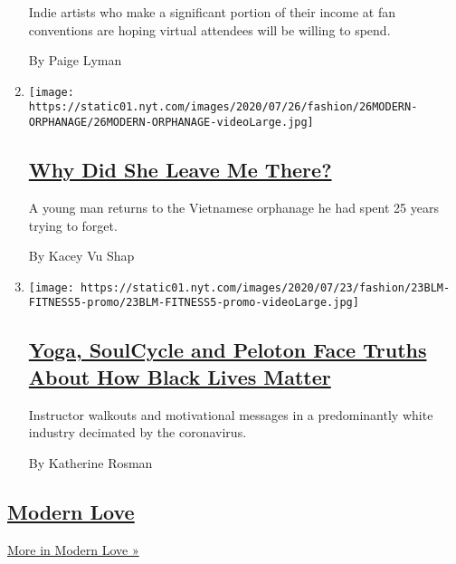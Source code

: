 \begin{enumerate}
  Indie artists who make a significant portion of their income at fan
  conventions are hoping virtual attendees will be willing to spend.

  By Paige Lyman
\item
  \texttt{[image: https://static01.nyt.com/images/2020/07/26/fashion/26MODERN-ORPHANAGE/26MODERN-ORPHANAGE-videoLarge.jpg]}

  \hypertarget{why-did-she-leave-me-there}{%
  \subsection{\texorpdfstring{\href{/2020/07/24/style/modern-love-adoption-vietnam-why-did-she-leave-me-there.html}{Why
  Did She Leave Me
  There?}}{Why Did She Leave Me There?}}\label{why-did-she-leave-me-there}}

  A young man returns to the Vietnamese orphanage he had spent 25 years
  trying to forget.

  By Kacey Vu Shap
\item
  \texttt{[image: https://static01.nyt.com/images/2020/07/23/fashion/23BLM-FITNESS5-promo/23BLM-FITNESS5-promo-videoLarge.jpg]}

  \hypertarget{yoga-soulcycle-and-peloton-face-truths-about-how-black-lives-matter}{%
  \subsection{\texorpdfstring{\href{/2020/07/23/style/peloton-black-lives-matter-ride-soul-cycle-y7.html}{Yoga,
  SoulCycle and Peloton Face Truths About How Black Lives
  Matter}}{Yoga, SoulCycle and Peloton Face Truths About How Black Lives Matter}}\label{yoga-soulcycle-and-peloton-face-truths-about-how-black-lives-matter}}

  Instructor walkouts and motivational messages in a predominantly white
  industry decimated by the coronavirus.

  By Katherine Rosman
\end{enumerate}

\hypertarget{modern-love}{%
\subsection{\texorpdfstring{\href{/column/modern-love}{Modern
Love}}{Modern Love}}\label{modern-love}}

\href{/column/modern-love}{More in Modern Love »}

